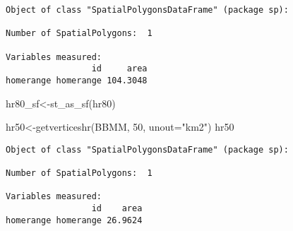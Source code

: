 \documentclass[
  letterpaper,
]{book}
\newenvironment{Shaded}{\begin{snugshade}}{\end{snugshade}}
\newcommand{\AttributeTok}[1]{\textcolor[rgb]{0.40,0.45,0.13}{#1}}
\newcommand{\DecValTok}[1]{\textcolor[rgb]{0.68,0.00,0.00}{#1}}
\newcommand{\FunctionTok}[1]{\textcolor[rgb]{0.28,0.35,0.67}{#1}}
\newcommand{\NormalTok}[1]{\textcolor[rgb]{0.00,0.23,0.31}{#1}}
\newcommand{\OtherTok}[1]{\textcolor[rgb]{0.00,0.23,0.31}{#1}}
\newcommand{\StringTok}[1]{\textcolor[rgb]{0.13,0.47,0.30}{#1}}
\begin{document}
\begin{verbatim}
Object of class "SpatialPolygonsDataFrame" (package sp):

Number of SpatialPolygons:  1

Variables measured:
                 id     area
homerange homerange 104.3048
\end{verbatim}

\begin{Shaded}
\begin{Highlighting}[]
\NormalTok{hr80\_sf}\OtherTok{\textless{}{-}}\FunctionTok{st\_as\_sf}\NormalTok{(hr80)}

\NormalTok{hr50}\OtherTok{\textless{}{-}}\FunctionTok{getverticeshr}\NormalTok{(BBMM, }\DecValTok{50}\NormalTok{, }\AttributeTok{unout=}\StringTok{"km2"}\NormalTok{)}
\NormalTok{hr50}
\end{Highlighting}
\end{Shaded}

\begin{verbatim}
Object of class "SpatialPolygonsDataFrame" (package sp):

Number of SpatialPolygons:  1

Variables measured:
                 id    area
homerange homerange 26.9624
\end{verbatim}
\end{document}

